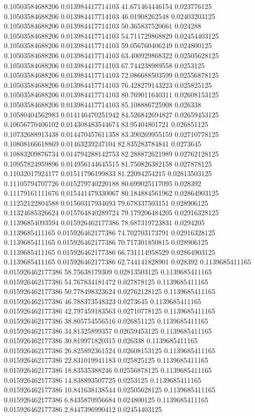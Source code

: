 0.10503584688206 0.013984417714103 41.671464446154 0.023776125
0.10503584688206 0.013984417714103 46.01908262548 0.02403203125
0.10503584688206 0.013984417714103 50.365837520661 0.024288
0.10503584688206 0.013984417714103 54.711729868829 0.02454403125
0.10503584688206 0.013984417714103 59.056760406249 0.024800125
0.10503584688206 0.013984417714103 63.400929868322 0.02505628125
0.10503584688206 0.013984417714103 67.744238989558 0.0253125
0.10503584688206 0.013984417714103 72.086688503599 0.02556878125
0.10503584688206 0.013984417714103 76.428279143223 0.025825125
0.10503584688206 0.013984417714103 80.769011640311 0.02608153125
0.10503584688206 0.013984417714103 85.108886725908 0.026338
0.10580404562983 0.014146470251942 84.526842694827 0.02659453125
0.10656770406102 0.014308483544674 83.95404801721 0.026851125
0.10732688913438 0.014470457611358 83.390269955159 0.02710778125
0.10808166618869 0.01463239247104 82.835283784841 0.0273645
0.10883209876734 0.014794288142753 82.288872621989 0.02762128125
0.10957824959896 0.014956144645515 81.750826382158 0.027878125
0.11032017924177 0.01511796199833 81.22094254215 0.02813503125
0.11105794707726 0.015279740220188 80.699025117095 0.028392
0.11179161111676 0.015441479330067 80.184884561962 0.02864903125
0.11252122804588 0.01560317934693 79.678337503151 0.028906125
0.11324685326624 0.015764840289724 79.179206484205 0.02916328125
0.11396854093594 0.015926462177386 78.687319723831 0.0294205
0.1139685411165 0.015926462177386 74.702703173791 0.02916328125
0.1139685411165 0.015926462177386 70.717301850815 0.028906125
0.1139685411165 0.015926462177386 66.731114958529 0.02864903125
0.1139685411165 0.015926462177386 62.744141828901 0.028392
0.1139685411165 0.015926462177386 58.75638179309 0.02813503125
0.1139685411165 0.015926462177386 54.767834181472 0.027878125
0.1139685411165 0.015926462177386 50.778498323624 0.02762128125
0.1139685411165 0.015926462177386 46.788373548323 0.0273645
0.1139685411165 0.015926462177386 42.797459183563 0.02710778125
0.1139685411165 0.015926462177386 38.805754556516 0.026851125
0.1139685411165 0.015926462177386 34.81325899357 0.02659453125
0.1139685411165 0.015926462177386 30.819971820315 0.026338
0.1139685411165 0.015926462177386 26.825892361524 0.02608153125
0.1139685411165 0.015926462177386 22.831019941183 0.025825125
0.1139685411165 0.015926462177386 18.83535388246 0.02556878125
0.1139685411165 0.015926462177386 14.838893507725 0.0253125
0.1139685411165 0.015926462177386 10.841638138544 0.02505628125
0.1139685411165 0.015926462177386 6.8435870956684 0.024800125
0.1139685411165 0.015926462177386 2.8447396990412 0.02454403125
